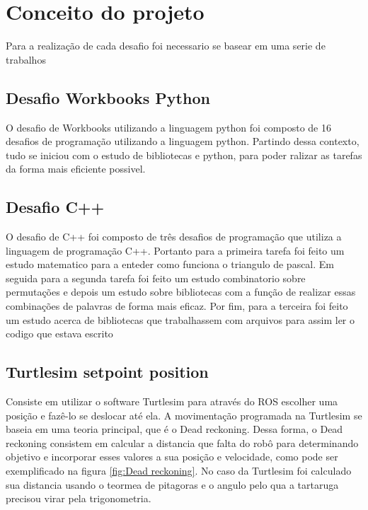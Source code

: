 \chapter{Conceito do projeto}
\label{chap:fundteor}

Para a realização de cada desafio foi necessario se basear em uma serie de trabalhos




\section{Desafio Workbooks Python}

O desafio de Workbooks utilizando a linguagem python foi composto de 16 desafios de programação utilizando a linguagem python. Partindo dessa contexto, tudo se iniciou com o estudo de bibliotecas e python, para poder ralizar as tarefas da forma mais eficiente possivel.

\section{Desafio C++}
O desafio de C++ foi composto de três desafios de programação que utiliza a linguagem de programação C++. Portanto para a primeira tarefa foi feito um estudo matematico para a enteder como funciona o triangulo de pascal. Em seguida para a segunda tarefa foi feito um estudo combinatorio sobre permutações e depois um estudo sobre bibliotecas  com a função de realizar essas combinações de palavras de forma mais eficaz. Por fim, para a terceira foi feito um estudo acerca de bibliotecas que trabalhassem com arquivos para assim ler o codigo que estava escrito

\section{Turtlesim setpoint position}
Consiste em utilizar o software Turtlesim para através do ROS escolher 
uma posição e fazê-lo se deslocar até ela. A movimentação programada na 
Turtlesim se baseia em uma teoria principal, que é o
Dead reckoning. Dessa forma, o Dead reckoning consistem em calcular a 
distancia que falta do robô para determinando objetivo e incorporar esses
valores a sua posição e velocidade, como pode ser exemplificado na figura \ref{fig:Dead reckoning}. No caso da Turtlesim foi calculado
sua distancia usando o teormea de pitagoras e o angulo pelo qua a tartaruga
precisou virar pela trigonometria.


